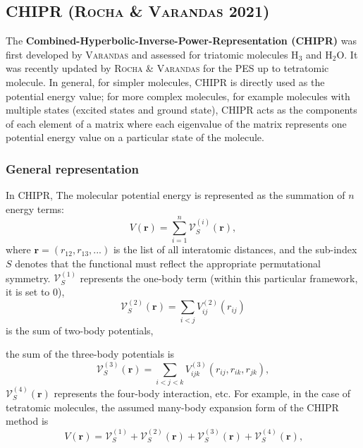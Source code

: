\documentclass[12pt]{article}
\begin{document}
\subsection{CHIPR (\textsc{Rocha \& Varandas} 2021)}
\label{subsecchipr}
The \textbf{Combined-Hyperbolic-Inverse-Power-Representation (CHIPR)} was first developed by \textsc{Varandas} \cite{idx8} and assessed for triatomic molecules H$_3$ and H$_2$O. It was recently updated by \textsc{Rocha \& Varandas} \cite{idx150} for the PES up to tetratomic molecule. In general, for simpler molecules, CHIPR is directly used as the potential energy value; for more complex molecules, for example molecules with multiple states (excited states and ground state), CHIPR acts as the components of each element of a matrix where each eigenvalue of the matrix represents one potential energy value on a particular state of the molecule.
\subsubsection{General representation}
In CHIPR, The molecular potential energy is represented as the summation of $n$ energy terms:
\begin{equation}
    V(\mathbf{r}) = \sum_{i=1}^n\mathcal{V}^{(i)}_S(\mathbf{r}),
\end{equation}
where $\mathbf{r} = (r_{12},r_{13},...)$ is the list of all interatomic distances, and the sub-index $S$ denotes that the functional must reflect the appropriate permutational symmetry. $\mathcal{V}_S^{(1)}$ represents the one-body term (within this particular framework, it is set to 0), 
\begin{equation}
    \mathcal{V}_S^{(2)}(\mathbf{r}) = \sum_{i<j} V_{ij}^{(2)}(r_{ij})
\end{equation}
is the sum of two-body potentials,

the sum of the three-body potentials is
\begin{equation}
    \mathcal{V}_S^{(3)}(\mathbf{r}) = \sum_{i<j<k} V_{ijk}^{(3)}(r_{ij},r_{ik},r_{jk}),
\end{equation}
$\mathcal{V}_S^{(4)}(\mathbf{r})$ represents the four-body interaction, etc. For example, in the case of tetratomic molecules, the assumed many-body expansion form of the CHIPR method is
\begin{equation}
    V(\mathbf{r}) = \mathcal{V}_S^{(1)} + \mathcal{V}_S^{(2)}(\mathbf{r}) + \mathcal{V}_S^{(3)}(\mathbf{r}) + \mathcal{V}_S^{(4)}(\mathbf{r}) \text{,}
    \label{eqchiprexample}
\end{equation}
\end{document}
